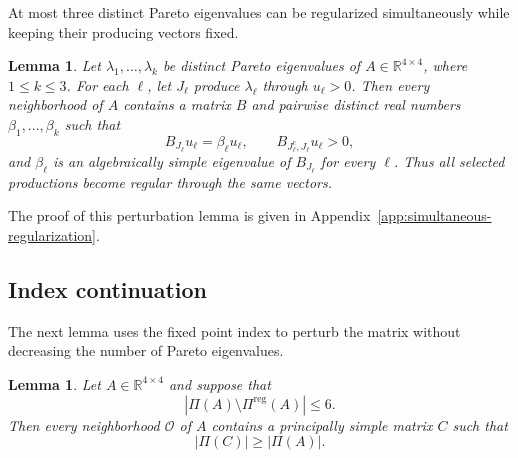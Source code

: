\documentclass[11pt,a4paper]{article}
\newtheorem{lemma}[theorem]{Lemma}
\theoremstyle{definition}
\newcommand{\R}{\mathbb R}
\begin{document}
At most three distinct Pareto eigenvalues can be regularized
simultaneously while keeping their producing vectors fixed.

\begin{lemma}
\label{lem:simultaneous-regularization}
Let $\lambda_1,\ldots,\lambda_k$ be distinct Pareto eigenvalues of
$A\in\R^{4\times4}$, where $1\leq k\leq3$. For each $\ell$, let
$J_\ell$ produce $\lambda_\ell$ through $u_\ell>0$. Then every
neighborhood of $A$ contains a matrix $B$ and pairwise distinct real
numbers $\beta_1,\ldots,\beta_k$ such that
$$
B_{J_\ell}u_\ell=\beta_\ell u_\ell,
\qquad
B_{J_\ell^{\mathrm c},J_\ell}u_\ell>0,
$$
and $\beta_\ell$ is an algebraically simple eigenvalue of
$B_{J_\ell}$ for every $\ell$. Thus all selected productions become
regular through the same vectors.
\end{lemma}

The proof of this perturbation lemma is given in
Appendix~\ref{app:simultaneous-regularization}.

\subsection{Index continuation}

The next lemma uses the fixed point index to perturb the matrix without
decreasing the number of Pareto eigenvalues.

\begin{lemma}
\label{lem:index-recovery}
Let $A\in\R^{4\times4}$ and suppose that
$$
|\Pi(A)\setminus\Pi^{\mathrm{reg}}(A)|\leq6.
$$
Then every neighborhood $\mathcal O$ of $A$ contains a principally
simple matrix $C$ such that
$$
|\Pi(C)|\geq|\Pi(A)|.
$$
\end{lemma}
\end{document}
